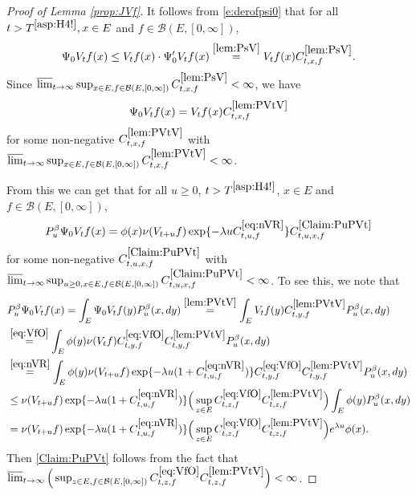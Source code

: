 \documentclass[12pt,a4paper]{amsart}
\numberwithin{equation}{section}
\theoremstyle{plain}
\theoremstyle{definition}
\theoremstyle{remark}
\begin{document}
\begin{proof}[Proof of Lemma \ref{prop:JVf}]
	It follows from \eqref{e:derofpsi0} that for all $t> T^{\eqref{asp:H4!}}, x\in E$ and $f\in \mathcal B(E,[0,\infty])$,
\begin{equation}
	\Psi_0 V_t f (x)
	\leq V_tf(x)\cdot \Psi_0' V_t f(x) \overset{\eqref{lem:PsV}}= V_tf(x) C^{\eqref{lem:PsV}}_{t,x,f}.
\end{equation}
	Since $\varlimsup_{t\to \infty} \sup_{x\in E, f\in \mathcal B(E,[0,\infty])} C^{\eqref{lem:PsV}}_{t,x,f} <\infty$, we have
\begin{equation} \label{lem:PVtV}
	\Psi_0 V_t f(x) = V_tf(x) C^{\eqref{lem:PVtV}}_{t,x,f}
\end{equation}
	for some non-negative $C^{\eqref{lem:PVtV}}_{t,x,f}$ with $\varlimsup_{t\to \infty} \sup_{x\in E, f\in \mathcal B(E,[0,\infty])}
	C^{\eqref{lem:PVtV}}_{t,x,f} < \infty$.
	
	From this we can get that for all $u\geq 0$, $t>T^{\eqref{asp:H4!}}$, $x\in E$ and $f\in \mathcal B(E,[0,\infty])$,
\begin{equation} \label{Claim:PuPVt}
	P_u^\beta \Psi_0 V_{t} f(x) = \phi(x)\nu(V_{t+u}f) \exp\{-\lambda u C^{\eqref{eq:nVR}}_{t,u,f} \} C^{\eqref{Claim:PuPVt}}_{t,u,x,f}
\end{equation}
	for some non-negative $C^{\eqref{Claim:PuPVt}}_{t,u,x,f}$ with
	$\varlimsup_{t\to \infty}
	\sup_{u\geq 0, x\in E, f\in \mathcal B(E,[0,\infty])}
	C^{\eqref{Claim:PuPVt}}_{t,u,x,f} < \infty$.
	To see this, we note that
	\begin{align}
	&P_u^\beta \Psi_0 V_{t} f(x)
	= \int_{E} \Psi_0V_tf(y) P_u^\beta (x,dy)
	\overset{\eqref{lem:PVtV}}=\int_{E} V_tf(y)C^{\eqref{lem:PVtV}}_{t,y,f} P_u^\beta (x,dy)
	\\&\overset{\eqref{eq:VfO}}=\int_{E} \phi(y)\nu(V_tf)C^{\eqref{eq:VfO}}_{t,y,f}C^{\eqref{lem:PVtV}}_{t,y,f} P_u^\beta (x,dy)
	\\&\overset{\eqref{eq:nVR}}=\int_{E} \phi(y)\nu(V_{t+u}f) \exp\{-\lambda u (1+C^{\eqref{eq:nVR}}_{t,u,f}) \} C^{\eqref{eq:VfO}}_{t,y,f}C^{\eqref{lem:PVtV}}_{t,y,f} P_u^\beta (x,dy)
	\\& \leq \nu(V_{t+u}f) \exp\{-\lambda u (1+C^{\eqref{eq:nVR}}_{t,u,f}) \} \Big(\sup_{z\in E} C^{\eqref{eq:VfO}}_{t,z,f}C^{\eqref{lem:PVtV}}_{t,z,f}\Big) \int_{E} \phi(y) P_u^\beta (x,dy)
	\\& = \nu(V_{t+u}f) \exp\{-\lambda u (1+C^{\eqref{eq:nVR}}_{t,u,f}) \} \Big(\sup_{z\in E} C^{\eqref{eq:VfO}}_{t,z,f}C^{\eqref{lem:PVtV}}_{t,z,f}\Big) e^{\lambda u}\phi(x).
	\end{align}
	Then \eqref{Claim:PuPVt} follows from the fact that
	$\varlimsup_{t\to \infty} \Big(
	\sup_{z\in E, f\in \mathcal B(E,[0,\infty])} C^{\eqref{eq:VfO}}_{t,z,f}
	C^{\eqref{lem:PVtV}}_{t,z,f}\Big) < \infty$.
	

\end{proof}
\end{document}
